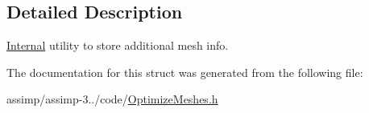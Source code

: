 \subsection{Detailed Description}
\hyperlink{struct_internal}{Internal} utility to store additional mesh info. 

The documentation for this struct was generated from the following file\+:\begin{DoxyCompactItemize}
\item 
assimp/assimp-\/3../code/\hyperlink{_optimize_meshes_8h}{Optimize\+Meshes.\+h}\end{DoxyCompactItemize}
